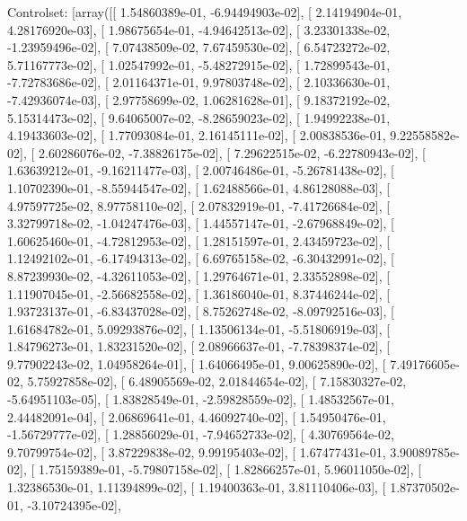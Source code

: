 \documentclass{article}
\begin{document}
Controlset: [array([[  1.54860389e-01,  -6.94494903e-02],
       [  2.14194904e-01,   4.28176920e-03],
       [  1.98675654e-01,  -4.94642513e-02],
       [  3.23301338e-02,  -1.23959496e-02],
       [  7.07438509e-02,   7.67459530e-02],
       [  6.54723272e-02,   5.71167773e-02],
       [  1.02547992e-01,  -5.48272915e-02],
       [  1.72899543e-01,  -7.72783686e-02],
       [  2.01164371e-01,   9.97803748e-02],
       [  2.10336630e-01,  -7.42936074e-03],
       [  2.97758699e-02,   1.06281628e-01],
       [  9.18372192e-02,   5.15314473e-02],
       [  9.64065007e-02,  -8.28659023e-02],
       [  1.94992238e-01,   4.19433603e-02],
       [  1.77093084e-01,   2.16145111e-02],
       [  2.00838536e-01,   9.22558582e-02],
       [  2.60286076e-02,  -7.38826175e-02],
       [  7.29622515e-02,  -6.22780943e-02],
       [  1.63639212e-01,  -9.16211477e-03],
       [  2.00746486e-01,  -5.26781438e-02],
       [  1.10702390e-01,  -8.55944547e-02],
       [  1.62488566e-01,   4.86128088e-03],
       [  4.97597725e-02,   8.97758110e-02],
       [  2.07832919e-01,  -7.41726684e-02],
       [  3.32799718e-02,  -1.04247476e-03],
       [  1.44557147e-01,  -2.67968849e-02],
       [  1.60625460e-01,  -4.72812953e-02],
       [  1.28151597e-01,   2.43459723e-02],
       [  1.12492102e-01,  -6.17494313e-02],
       [  6.69765158e-02,  -6.30432991e-02],
       [  8.87239930e-02,  -4.32611053e-02],
       [  1.29764671e-01,   2.33552898e-02],
       [  1.11907045e-01,  -2.56682558e-02],
       [  1.36186040e-01,   8.37446244e-02],
       [  1.93723137e-01,  -6.83437028e-02],
       [  8.75262748e-02,  -8.09792516e-03],
       [  1.61684782e-01,   5.09293876e-02],
       [  1.13506134e-01,  -5.51806919e-03],
       [  1.84796273e-01,   1.83231520e-02],
       [  2.08966637e-01,  -7.78398374e-02],
       [  9.77902243e-02,   1.04958264e-01],
       [  1.64066495e-01,   9.00625890e-02],
       [  7.49176605e-02,   5.75927858e-02],
       [  6.48905569e-02,   2.01844654e-02],
       [  7.15830327e-02,  -5.64951103e-05],
       [  1.83828549e-01,  -2.59828559e-02],
       [  1.48532567e-01,   2.44482091e-04],
       [  2.06869641e-01,   4.46092740e-02],
       [  1.54950476e-01,  -1.56729777e-02],
       [  1.28856029e-01,  -7.94652733e-02],
       [  4.30769564e-02,   9.70799754e-02],
       [  3.87229838e-02,   9.99195403e-02],
       [  1.67477431e-01,   3.90089785e-02],
       [  1.75159389e-01,  -5.79807158e-02],
       [  1.82866257e-01,   5.96011050e-02],
       [  1.32386530e-01,   1.11394899e-02],
       [  1.19400363e-01,   3.81110406e-03],
       [  1.87370502e-01,  -3.10724395e-02],
\end{document}
